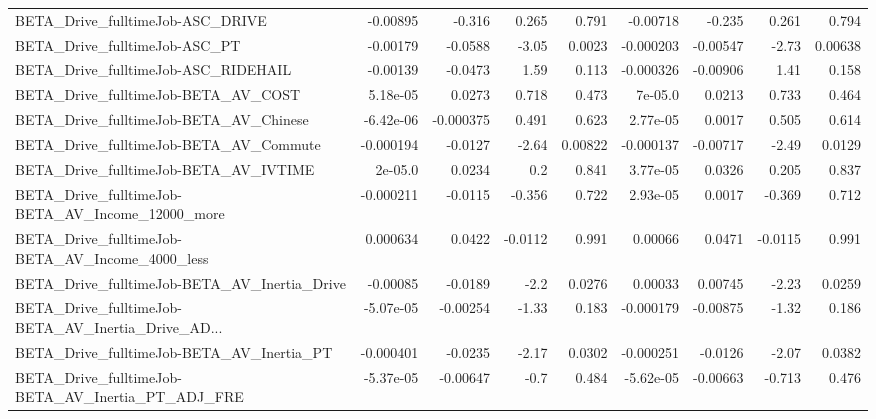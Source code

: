 \begin{tabular}{lrrrrrrrr}
BETA\_Drive\_fulltimeJob-ASC\_DRIVE                   &    -0.00895 &       -0.316 &    0.265 &    0.791 &   -0.00718 &      -0.235 &        0.261 &         0.794 \\
BETA\_Drive\_fulltimeJob-ASC\_PT                      &    -0.00179 &      -0.0588 &    -3.05 &   0.0023 &  -0.000203 &    -0.00547 &        -2.73 &       0.00638 \\
BETA\_Drive\_fulltimeJob-ASC\_RIDEHAIL                &    -0.00139 &      -0.0473 &     1.59 &    0.113 &  -0.000326 &    -0.00906 &         1.41 &         0.158 \\
BETA\_Drive\_fulltimeJob-BETA\_AV\_COST                &    5.18e-05 &       0.0273 &    0.718 &    0.473 &    7e-05.0 &      0.0213 &        0.733 &         0.464 \\
BETA\_Drive\_fulltimeJob-BETA\_AV\_Chinese             &   -6.42e-06 &    -0.000375 &    0.491 &    0.623 &   2.77e-05 &      0.0017 &        0.505 &         0.614 \\
BETA\_Drive\_fulltimeJob-BETA\_AV\_Commute             &   -0.000194 &      -0.0127 &    -2.64 &  0.00822 &  -0.000137 &    -0.00717 &        -2.49 &        0.0129 \\
BETA\_Drive\_fulltimeJob-BETA\_AV\_IVTIME              &     2e-05.0 &       0.0234 &      0.2 &    0.841 &   3.77e-05 &      0.0326 &        0.205 &         0.837 \\
BETA\_Drive\_fulltimeJob-BETA\_AV\_Income\_12000\_more   &   -0.000211 &      -0.0115 &   -0.356 &    0.722 &   2.93e-05 &      0.0017 &       -0.369 &         0.712 \\
BETA\_Drive\_fulltimeJob-BETA\_AV\_Income\_4000\_less    &    0.000634 &       0.0422 &  -0.0112 &    0.991 &    0.00066 &      0.0471 &      -0.0115 &         0.991 \\
BETA\_Drive\_fulltimeJob-BETA\_AV\_Inertia\_Drive       &    -0.00085 &      -0.0189 &     -2.2 &   0.0276 &    0.00033 &     0.00745 &        -2.23 &        0.0259 \\
BETA\_Drive\_fulltimeJob-BETA\_AV\_Inertia\_Drive\_AD... &   -5.07e-05 &     -0.00254 &    -1.33 &    0.183 &  -0.000179 &    -0.00875 &        -1.32 &         0.186 \\
BETA\_Drive\_fulltimeJob-BETA\_AV\_Inertia\_PT          &   -0.000401 &      -0.0235 &    -2.17 &   0.0302 &  -0.000251 &     -0.0126 &        -2.07 &        0.0382 \\
BETA\_Drive\_fulltimeJob-BETA\_AV\_Inertia\_PT\_ADJ\_FRE  &   -5.37e-05 &     -0.00647 &     -0.7 &    0.484 &  -5.62e-05 &    -0.00663 &       -0.713 &         0.476 \\

\end{tabular}
